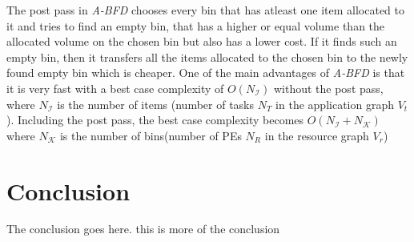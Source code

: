 \documentclass[10pt, conference, compsocconf]{IEEEtran}
\begin{document}
The post pass in \textit{A-BFD} chooses every bin that has atleast one
item allocated to it and tries to find an empty bin, that has a higher
or equal volume than the allocated volume on the chosen bin but also has
a lower cost. If it finds such an empty bin, then it transfers all the
items allocated to the chosen bin to the newly found empty bin which is
cheaper. One of the main advantages of \textit{A-BFD} is that it is very
fast with a best case complexity of $O(N_\mathcal{I})$ without the post
pass, where $N_\mathcal{I}$ is the number of items (number of tasks
$N_T$ in the application graph $V_t$). Including the post pass, the best
case complexity becomes $O(N_\mathcal{I} + N_\mathcal{K})$ where
$N_\mathcal{K}$ is the number of bins(number of PEs $N_R$ in the
resource graph $V_r$)

\section{Conclusion}
\label{sec:conclusion}

The conclusion goes here. this is more of the conclusion







%
%
%

\scriptsize{

% 

}

\end{document}
